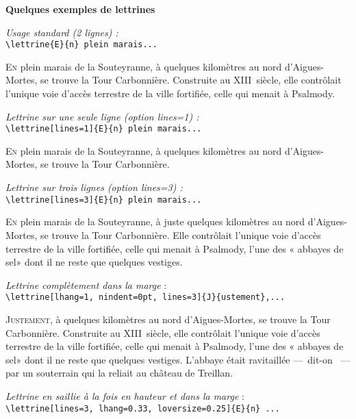 \documentclass[paper=a4,12pt,german,french]{scrartcl}
\begin{document}
\thispagestyle{empty}

\begin{center}
\large\bfseries Quelques exemples de lettrines
\end{center}

\vspace{\baselineskip}
\textit{Usage standard (2 lignes) :}\\
\verb+\lettrine{E}{n} plein marais...+

\lettrine{E}{n} plein marais de la Souteyranne, à quelques kilomètres
au nord d'Aigues-Mortes, se trouve la Tour Carbonnière.
Construite au XIII\ieme~siècle, elle contrôlait l'unique voie d'accès
terrestre de la ville fortifiée, celle qui menait à Psalmody.

\vspace{\baselineskip}
\textit{Lettrine sur une seule ligne (option {\ttfamily\upshape lines=1}) :}\\
\verb+\lettrine[lines=1]{E}{n} plein marais...+

\lettrine[lines=1]{E}{n} plein marais de la Souteyranne,
à quelques kilomètres au nord d'Aigues-Mortes, se trouve
la Tour Carbonnière.

\vspace{\baselineskip}
\textit{Lettrine sur trois lignes (option {\ttfamily\upshape lines=3}) :}\\
\verb+\lettrine[lines=3]{E}{n} plein marais...+

\lettrine[lines=3]{E}{n} plein marais de la Souteyranne,
à juste quelques kilomètres au nord d'Aigues-Mortes,
se trouve la Tour Carbonnière.
Elle contrôlait l'unique voie d'accès
terrestre de la ville fortifiée, celle qui menait à Psalmody,
l'une des « abbayes de sel» dont il ne reste que quelques vestiges.

\vspace{\baselineskip}
\textit{Lettrine complètement dans la marge} :\\
\verb+\lettrine[lhang=1, nindent=0pt, lines=3]{J}{ustement},...+

\lettrine[lhang=1, nindent=0pt, lines=3]{J}{ustement},
à quelques kilomètres au nord d'Aigues-Mortes,
se trouve la Tour Carbonnière.
Construite au XIII\ieme~siècle, elle contrôlait l'unique voie d'accès
terrestre de la ville fortifiée, celle qui menait à Psalmody,
l'une des « abbayes de sel» dont il ne reste que quelques vestiges.
L'abbaye était ravitaillée ---~dit-on ~--- par un souterrain
qui la reliait au château de Treillan.

\vspace{\baselineskip}
\textit{Lettrine en saillie à la fois en hauteur et dans la marge} :\\
\verb+\lettrine[lines=3, lhang=0.33, loversize=0.25]{E}{n} ...+
\end{document}
